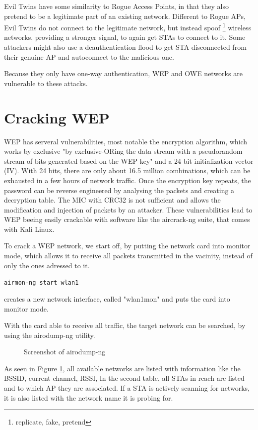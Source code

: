 Evil Twins have some similarity to Rogue Access Points, in that they also pretend to be a legitimate part of an existing network.
Different to Rogue APs, Evil Twins do not connect to the legitimate network, but instead spoof \footnote{replicate, fake, pretend} wireless networks, providing a stronger signal, to again get STAs to connect to it.
Some attackers might also use a deauthentication flood to get STA disconnected from their genuine AP and autoconnect to the malicious one.

Because they only have one-way authentication, WEP and OWE networks are vulnerable to these attacks. \cite[page~105,119]{Sankaran_Gulasekaran_2021} 

\section{Cracking WEP}
WEP has serveral vulnerabilities, most notable the encryption algorithm, which works by exclusive "by exclusive-ORing the data stream with a pseudorandom stream of bits generated based on the WEP key" \cite[page~104]{Sankaran_Gulasekaran_2021} and a 24-bit initialization vector (IV).
With 24 bits, there are only about 16.5 million combinations, which can be exhausted in a few hours of network traffic.
Once the encryption key repeats, the password can be reverse engineered by analysing the packets and creating a decryption table.
The MIC with CRC32 is not sufficient and allows the modification and injection of packets by an attacker. \cite{Oriyano_2017}
These vulnerabilities lead to WEP beeing easily crackable with software like the aircrack-ng suite, that comes with Kali Linux.

To crack a WEP network, we start off, by putting the network card into monitor mode, which allows it to receive all packets transmitted in the vacinity, instead of only the ones adressed to it.

\lstinline[language=bash]|airmon-ng start wlan1| 
 
creates a new network interface, called "wlan1mon" and puts the card into monitor mode.

With the card able to receive all traffic, the target network can be searched, by using the airodump-ng utility.

\begin{figure}[h]
    \centering
    \caption{Screenshot of airodump-ng}
    \label{fig:airodump-ng}
\end{figure}

As seen in Figure \cref{fig:airodump-ng}, all available networks are listed with information like the BSSID, current channel, RSSI,
In the second table, all STAs in reach are listed and to which AP they are associated.
If a STA is actively scanning for networks, it is also listed with the network name it is probing for.

